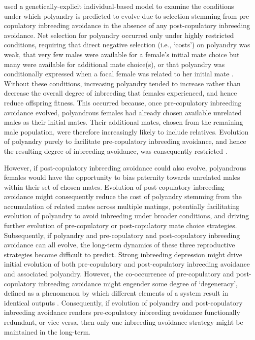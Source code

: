 \documentclass[10pt,letterpaper]{article}
\begin{document}
\cite{Duthie} used a genetically-explicit individual-based model to examine the conditions under which polyandry is predicted to evolve due to selection stemming from pre-copulatory inbreeding avoidance in the absence of any post-copulatory inbreeding avoidance. Net selection for polyandry occurred only under highly restricted conditions, requiring that direct negative selection (i.e., `costs') on polyandry was weak, that very few males were available for a female's initial mate choice but many were available for additional mate choice(s), or that polyandry was conditionally expressed when a focal female was related to her initial mate \cite[][]{Duthie}. Without these conditions, increasing polyandry tended to increase rather than decrease the overall degree of inbreeding that females experienced, and hence reduce offspring fitness. This occurred because, once pre-copulatory inbreeding avoidance evolved, polyandrous females had already chosen available unrelated males as their initial mates. Their additional mates, chosen from the remaining male population, were therefore increasingly likely to include relatives. Evolution of polyandry purely to facilitate pre-copulatory inbreeding avoidance, and hence the resulting degree of inbreeding avoidance, was consequently restricted \cite[][]{Duthie}. 

However, if post-copulatory inbreeding avoidance could also evolve, polyandrous females would have the opportunity to bias paternity towards unrelated males within their set of chosen mates. Evolution of post-copulatory inbreeding avoidance might consequently reduce the cost of polyandry stemming from the accumulation of related mates across multiple matings, potentially facilitating evolution of polyandry to avoid inbreeding under broader conditions, and driving further evolution of pre-copulatory or post-copulatory mate choice strategies. Subsequently, if polyandry and pre-copulatory and post-copulatory inbreeding avoidance can all evolve, the long-term dynamics of these three reproductive strategies become difficult to predict. Strong inbreeding depression might drive initial evolution of both pre-copulatory and post-copulatory inbreeding avoidance and associated polyandry. However, the co-occurrence of pre-copulatory and post-copulatory inbreeding avoidance might engender some degree of `degeneracy', defined as a phenomenon by which different elements of a system result in identical outputs \cite[][]{Edelman2001}. Consequently, if evolution of polyandry and post-copulatory inbreeding avoidance renders pre-copulatory inbreeding avoidance functionally redundant, or vice versa, then only one inbreeding avoidance strategy might be maintained in the long-term.
\end{document}
